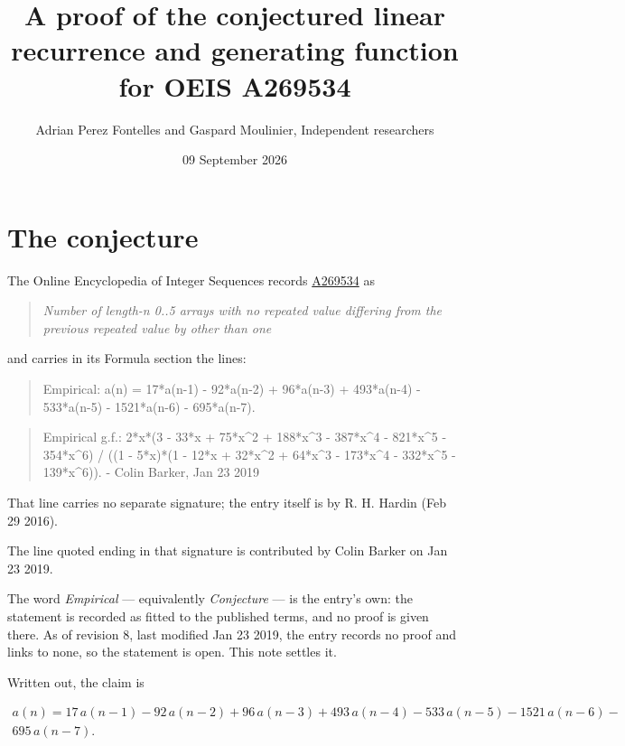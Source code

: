 \documentclass[11pt]{article}
\title{A proof of the conjectured linear recurrence and generating function for OEIS A269534}
\author{Adrian Perez Fontelles and Gaspard Moulinier, Independent researchers}
\date{09 September 2026}
\theoremstyle{definition}
\begin{document}
\maketitle
\section{The conjecture}

The Online Encyclopedia of Integer Sequences records \href{https://oeis.org/A269534}{A269534} as

\begin{quote}\itshape Number of length-n 0..5 arrays with no repeated value differing from the previous repeated value by other than one\end{quote}

and carries in its Formula section the lines:

\begin{quote}\ttfamily Empirical: a(n) = 17*a(n-1) - 92*a(n-2) + 96*a(n-3) + 493*a(n-4) - 533*a(n-5) - 1521*a(n-6) - 695*a(n-7).\end{quote}

\begin{quote}\ttfamily Empirical g.f.: 2*x*(3 - 33*x + 75*x\textasciicircum{}2 + 188*x\textasciicircum{}3 - 387*x\textasciicircum{}4 - 821*x\textasciicircum{}5 - 354*x\textasciicircum{}6) / ((1 - 5*x)*(1 - 12*x + 32*x\textasciicircum{}2 + 64*x\textasciicircum{}3 - 173*x\textasciicircum{}4 - 332*x\textasciicircum{}5 - 139*x\textasciicircum{}6)). - Colin Barker, Jan 23 2019\end{quote}

That line carries no separate signature; the entry itself is by R. H. Hardin (Feb 29 2016).

The line quoted ending in that signature is contributed by Colin Barker on Jan 23 2019.

The word {\itshape Empirical} --- equivalently {\itshape Conjecture} --- is the entry's own: the statement is recorded as fitted to the published terms, and no proof is given there. As of revision 8, last modified Jan 23 2019, the entry records no proof and links to none, so the statement is open. This note settles it.

Written out, the claim is

\begin{multline*} a(n) = 17\,a(n-1) - 92\,a(n-2) + 96\,a(n-3) + 493\,a(n-4) - 533\,a(n-5) - 1521\,a(n-6) - \\ 695\,a(n-7). \end{multline*}
\end{document}
